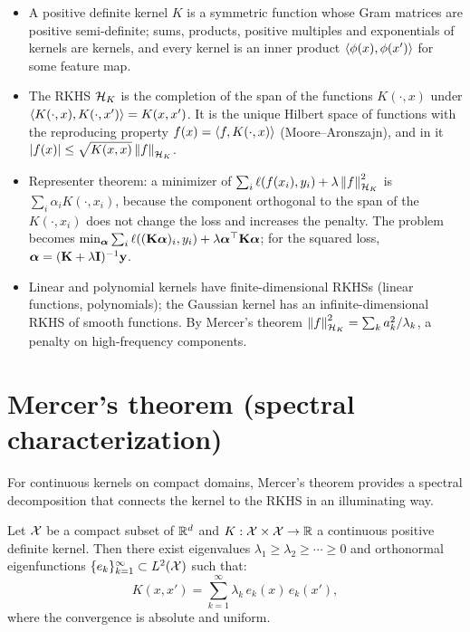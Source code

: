 \begin{notechapter}
\begin{chaptersummary}
\begin{itemize}
\item A positive definite kernel $K$ is a symmetric function whose Gram matrices are positive semi-definite; sums, products, positive multiples and exponentials of kernels are kernels, and every kernel is an inner product $\left\langle \phi(x), \phi(x') \right\rangle$ for some feature map.
\item The RKHS $\mathcal{H}_K$ is the completion of the span of the functions $K(\cdot, x)$ under $\left\langle K(\cdot,x), K(\cdot,x') \right\rangle = K(x,x')$. It is the unique Hilbert space of functions with the reproducing property $f(x) = \left\langle f, K(\cdot,x) \right\rangle$ (Moore--Aronszajn), and in it $\left|f(x)\right| \le \sqrt{K(x,x)}\left\|f\right\|_{\mathcal{H}_K}$.
\item Representer theorem: a minimizer of $\sum_i\ell(f(x_i),y_i) + \lambda\left\|f\right\|_{\mathcal{H}_K}^2$ is $\sum_i\alpha_iK(\cdot,x_i)$, because the component orthogonal to the span of the $K(\cdot,x_i)$ does not change the loss and increases the penalty. The problem becomes $\min_{\boldsymbol{\alpha}}\sum_i\ell((\mathbf{K}\boldsymbol{\alpha})_i,y_i) + \lambda\boldsymbol{\alpha}^\top\mathbf{K}\boldsymbol{\alpha}$; for the squared loss, $\boldsymbol{\alpha} = (\mathbf{K} + \lambda\mathbf{I})^{-1}\mathbf{y}$.
\item Linear and polynomial kernels have finite-dimensional RKHSs (linear functions, polynomials); the Gaussian kernel has an infinite-dimensional RKHS of smooth functions. By Mercer's theorem $\left\|f\right\|_{\mathcal{H}_K}^2 = \sum_ka_k^2/\lambda_k$, a penalty on high-frequency components.
\end{itemize}
\end{chaptersummary}

\chapterappendix

\section{Mercer's theorem (spectral characterization)}
\label{rkhs:sec:mercer}

For continuous kernels on compact domains, Mercer's theorem provides a
spectral decomposition that connects the kernel to the RKHS in an
illuminating way.

\begin{theorem}
\label{rkhs:thm:mercer}
Let $\mathcal{X}$ be a compact subset of $\mathbb{R}^d$ and $K: \mathcal{X} \times \mathcal{X} \to \mathbb{R}$ a
continuous positive definite kernel. Then there exist eigenvalues
$\lambda_1 \geq \lambda_2 \geq \cdots \geq 0$ and orthonormal
eigenfunctions $\{e_k\}_{k=1}^\infty \subset L^2(\mathcal{X})$ such that:
\begin{equation}
\label{rkhs:eq:mercer}
K(x,x') = \sum_{k=1}^\infty \lambda_k\, e_k(x)\, e_k(x'),
\end{equation}
where the convergence is absolute and uniform.
\end{theorem}


\end{notechapter}
